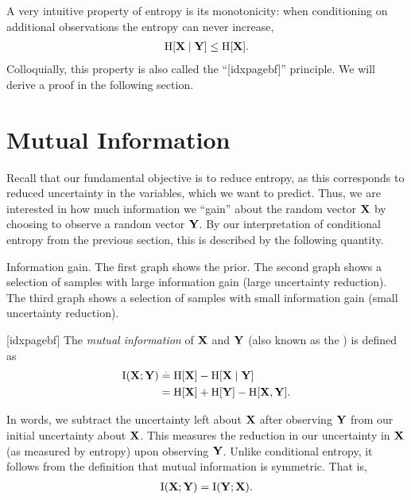 A very intuitive property of entropy is its monotonicity: when conditioning on additional observations the entropy can never increase, \begin{align}
  \H{\rX \mid \rY} \leq \H{\rX}. \label{eq:information_never_hurts}
\end{align}
Colloquially, this property is also called the ``[idxpagebf]'' principle.
We will derive a proof in the following section.

\section{Mutual Information}\label{sec:mutual_information}

Recall that our fundamental objective is to reduce entropy, as this corresponds to reduced uncertainty in the variables, which we want to predict.
Thus, we are interested in how much information we ``gain'' about the random vector $\mathbf{X}$ by choosing to observe a random vector $\mathbf{Y}$.
By our interpretation of conditional entropy from the previous section, this is described by the following quantity.

\begin{marginfigure}[-\baselineskip]
  \caption{Information gain.
  The first graph shows the prior.
  The second graph shows a selection of samples with large information gain (large uncertainty reduction).
  The third graph shows a selection of samples with small information gain (small uncertainty reduction).}
\end{marginfigure}

\begin{defn}[idxpagebf]
  The \emph{mutual information} of $\mathbf{X}$ and $\mathbf{Y}$ (also known as the ) is defined as \begin{align}
    \I{\rX}{\rY} &\defeq \H{\rX} - \H{\rX \mid \rY} \label{eq:mi} \\
    &= \H{\rX} + \H{\rY} - \H{\rX, \rY}.
  \end{align}
\end{defn}

In words, we subtract the uncertainty left about $\mathbf{X}$ after observing $\mathbf{Y}$ from our initial uncertainty about $\mathbf{X}$.
This measures the reduction in our uncertainty in $\mathbf{X}$ (as measured by entropy) upon observing $\mathbf{Y}$.
Unlike conditional entropy, it follows from the definition that mutual information is symmetric.
That is, \begin{align}
  \I{\rX}{\rY} = \I{\rY}{\rX}. \label{eq:mi_symmetry}
\end{align}

